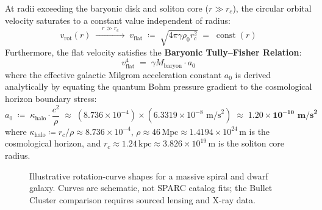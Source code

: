 \documentclass[
    12pt,
    a4paper,
    headings=normal,
    twoside=false,
    open=any,
    parskip=half
]{scrbook}
\begin{document}
\begin{phystheorem}\label{thm:ch11_flat_rotation_velocity_theorem}
At radii exceeding the baryonic disk and soliton core ($r \gg r_c$), the circular orbital velocity saturates to a constant value independent of radius:
\begin{equation}
\boxed{v_{\text{rot}}(r) \;\xrightarrow{\quad r \gg r_c \quad}\; v_{\text{flat}} \;\coloneqq\; \sqrt{4\pi \gamma \rho_0 r_c^2} \;=\; \operatorname{const}(r)}
\label{eq:ch11_flat_velocity_formula_master}
\end{equation}
Furthermore, the flat velocity satisfies the \textbf{Baryonic Tully--Fisher Relation}:
\begin{equation}
\boxed{v_{\text{flat}}^4 \;=\; \gamma M_{\text{baryon}} \cdot a_0}
\label{eq:ch11_baryonic_tully_fisher_master}
\end{equation}
where the effective galactic Milgrom acceleration constant $a_0$ is derived analytically by equating the quantum Bohm pressure gradient to the cosmological horizon boundary stress:
\begin{equation}
\boxed{a_0 \;\coloneqq\; \kappa_{\text{halo}} \cdot \frac{c^2}{\rho} \;\approx\; (8.736 \times 10^{-4}) \times (6.3319 \times 10^{-8} \text{ m/s}^2) \;\approx\; \mathbf{1.20 \times 10^{-10} \text{ m/s}^2}}
\label{eq:ch11_a0_acceleration_derived}
\end{equation}
where $\kappa_{\text{halo}} \coloneqq r_c / \rho \approx 8.736 \times 10^{-4}$, $\rho \approx 46\,\text{Mpc} \approx 1.4194 \times 10^{24}\,\text{m}$ is the cosmological horizon, and $r_c \approx 1.24\,\text{kpc} \approx 3.826 \times 10^{19}\,\text{m}$ is the soliton core radius.
\end{phystheorem}
\begin{figure}[htbp]\centering
{}
\caption{Illustrative rotation-curve shapes for a massive spiral and dwarf galaxy. Curves are schematic, not SPARC catalog fits; the Bullet Cluster comparison requires sourced lensing and X-ray data.}\label{fig:ch11_sparc_and_bullet_cluster}\end{figure}
\end{document}

